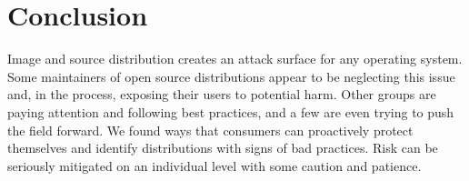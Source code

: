 \documentclass[conference]{IEEEtran}
\begin{document}




\section{Conclusion}

Image and source distribution creates an attack surface for any
operating system. Some maintainers of open source distributions
appear to be neglecting this issue and, in the process, exposing
their users to potential harm. Other groups are paying attention
and following best practices, and a few are even trying to push
the field forward. We found ways that consumers can proactively
protect themselves and identify distributions with signs of
bad practices. Risk can be seriously mitigated on an individual
level with some caution and patience.







%
%

\end{document}
